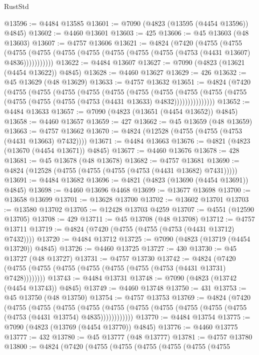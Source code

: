 \begin{lexlean}{RustStd}
\begin{coremodule}
@13596 := @4484 @13585
@13601 := @7090 (@4823 (@13595 (@4454 @13596)) @4845)
@13602 := @4460 @13601
@13603 := 425
@13606 := @45 @13603 (@48 @13603)
@13607 := @4757 @13606
@13621 := @4824
    (@7420
      (@4755
        (@4755
          (@4755 (@4755 (@4755 (@4755 (@4755 (@4755 (@4755 (@4753 (@4431 @13607) @4836)))))))))))
@13622 := @4484 @13607
@13627 := @7090 (@4823 (@13621 (@4454 @13622)) @4845)
@13628 := @4460 @13627
@13629 := 426
@13632 := @45 @13629 (@48 @13629)
@13633 := @4757 @13632
@13651 := @4824
    (@7420
      (@4755
        (@4755
          (@4755
            (@4755
              (@4755
                (@4755
                  (@4755
                    (@4755
                      (@4755 (@4755 (@4755 (@4755 (@4755 (@4753 (@4431 @13633) @4832)))))))))))))))
@13652 := @4484 @13633
@13657 := @7090 (@4823 (@13651 (@4454 @13652)) @4845)
@13658 := @4460 @13657
@13659 := 427
@13662 := @45 @13659 (@48 @13659)
@13663 := @4757 @13662
@13670 := @4824 (@12528 (@4755 (@4755 (@4753 (@4431 @13663) @7432))))
@13671 := @4484 @13663
@13676 := @4821 (@4823 (@13670 (@4454 @13671)) @4845)
@13677 := @4460 @13676
@13678 := 428
@13681 := @45 @13678 (@48 @13678)
@13682 := @4757 @13681
@13690 := @4824 (@12528 (@4755 (@4755 (@4755 (@4753 (@4431 @13682) @7431)))))
@13691 := @4484 @13682
@13696 := @4821 (@4823 (@13690 (@4454 @13691)) @4845)
@13698 := @4460 @13696 @4468
@13699 := @13677 @13698
@13700 := @13658 @13699
@13701 := @13628 @13700
@13702 := @13602 @13701
@13703 := @13580 @13702
@13705 := @12428 @13703 @4259
@13707 := @4551 (@12590 @13705)
@13708 := 429
@13711 := @45 @13708 (@48 @13708)
@13712 := @4757 @13711
@13719 := @4824 (@7420 (@4755 (@4755 (@4753 (@4431 @13712) @7432))))
@13720 := @4484 @13712
@13725 := @7090 (@4823 (@13719 (@4454 @13720)) @4845)
@13726 := @4460 @13725
@13727 := 430
@13730 := @45 @13727 (@48 @13727)
@13731 := @4757 @13730
@13742 := @4824 (@7420 (@4755 (@4755 (@4755 (@4755 (@4755 (@4755 (@4753 (@4431 @13731) @7428))))))))
@13743 := @4484 @13731
@13748 := @7090 (@4823 (@13742 (@4454 @13743)) @4845)
@13749 := @4460 @13748
@13750 := 431
@13753 := @45 @13750 (@48 @13750)
@13754 := @4757 @13753
@13769 := @4824
    (@7420
      (@4755
        (@4755
          (@4755
            (@4755 (@4755 (@4755 (@4755 (@4755 (@4755 (@4755 (@4753 (@4431 @13754) @4835))))))))))))
@13770 := @4484 @13754
@13775 := @7090 (@4823 (@13769 (@4454 @13770)) @4845)
@13776 := @4460 @13775
@13777 := 432
@13780 := @45 @13777 (@48 @13777)
@13781 := @4757 @13780
@13800 := @4824
    (@7420
      (@4755
        (@4755
          (@4755
            (@4755
              (@4755
                (@4755

\end{coremodule}
\end{lexlean}
